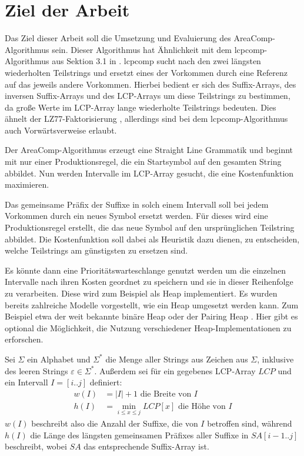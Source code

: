 \chapter{Ziel der Arbeit}

Das Ziel dieser Arbeit soll die Umsetzung und Evaluierung des AreaComp-Algorithmus sein. Dieser Algorithmus hat Ähnlichkeit mit dem lcpcomp-Algorithmus aus Sektion 3.1 in \cite{dinklage_compression_2017}.
lcpcomp sucht nach den zwei längsten wiederholten Teilstrings und ersetzt eines der Vorkommen durch eine Referenz auf das jeweils andere Vorkommen.
Hierbei bedient er sich des Suffix-Arrays, des inversen Suffix-Arrays und des LCP-Arrays \cite{manber_suffix_1993} um diese Teilstrings zu bestimmen, da große Werte im LCP-Array lange wiederholte Teilstrings bedeuten. Dies ähnelt der LZ77-Faktorisierung \cite{ziv_universal_1977}, allerdings sind bei dem lcpcomp-Algorithmus auch Vorwärtsverweise erlaubt.

Der AreaComp-Algorithmus erzeugt eine Straight Line Grammatik und beginnt mit nur einer Produktionsregel, die ein Startsymbol auf den gesamten String abbildet.
Nun werden Intervalle im LCP-Array gesucht, die eine Kostenfunktion maximieren. 

Das gemeinsame Präfix der Suffixe in solch einem Intervall soll bei jedem Vorkommen durch ein neues Symbol ersetzt werden. Für dieses wird eine Produktionsregel erstellt, die das neue Symbol auf den ursprünglichen Teilstring abbildet. Die Kostenfunktion soll dabei als Heuristik dazu dienen, zu entscheiden, welche Teilstrings am günstigsten zu ersetzen sind.

Es könnte dann eine Prioritätswarteschlange genutzt werden um die einzelnen Intervalle nach ihren Kosten geordnet zu speichern und sie in dieser Reihenfolge zu verarbeiten. 
Diese wird zum Beispiel als Heap implementiert. Es wurden bereits zahlreiche Modelle vorgestellt, wie ein Heap umgesetzt werden kann. Zum Beispiel etwa der weit bekannte binäre Heap \cite{williams_algorithm_1964} oder der Pairing Heap \cite{fredman_pairing_1986}. Hier gibt es optional die Möglichkeit, die Nutzung verschiedener Heap-Implementationen \cite{larkin_back--basics_2013} zu erforschen.

Sei $\Sigma$ ein Alphabet und $\Sigma^*$ die Menge aller Strings aus Zeichen aus $\Sigma$, inklusive des leeren Strings $\varepsilon \in \Sigma^*$. Außerdem sei für ein gegebenes LCP-Array $LCP$ und ein Intervall $I = [i..j]$ definiert:
\begin{align*}
    w(I) &= |I| + 1 \text{ die Breite von $I$}\\
    h(I) &= \min_{i \leq x \leq j} LCP[x] \text{ die Höhe von $I$} 
\end{align*}
$w(I)$ beschreibt also die Anzahl der Suffixe, die von $I$ betroffen sind, während $h(I)$ die Länge des längsten gemeinsamen Präfixes aller Suffixe in $SA[i - 1..j]$ beschreibt, wobei $SA$ das entsprechende Suffix-Array ist.

